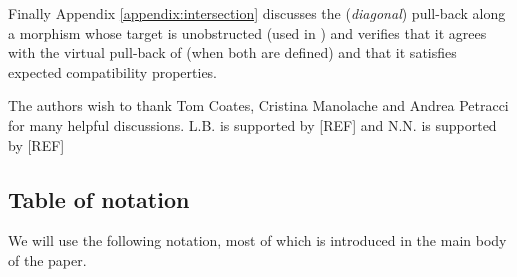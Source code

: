 Finally Appendix \ref{appendix:intersection} discusses the (\emph{diagonal}) pull-back along a morphism whose target is unobstructed (used in \cite{Ga}) and verifies that it agrees with the virtual pull-back of \cite{Manolache-Pull} (when both are defined) and that it satisfies expected compatibility properties.


\begin{acknowledgements} The authors wish to thank Tom Coates, Cristina Manolache and Andrea Petracci for many helpful discussions. L.B. is supported by [REF] and N.N. is supported by [REF]
\end{acknowledgements}

\subsection{Table of notation} We will use the following notation, most of which is introduced in the main body of the paper.

